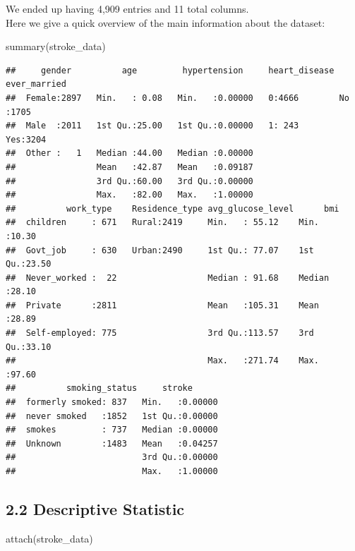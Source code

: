 \documentclass[
]{article}
\newenvironment{Shaded}{\begin{snugshade}}{\end{snugshade}}
\newcommand{\FunctionTok}[1]{\textcolor[rgb]{0.00,0.00,0.00}{#1}}
\newcommand{\NormalTok}[1]{#1}
\begin{document}
We ended up having 4,909 entries and 11 total columns.\\
Here we give a quick overview of the main information about the dataset:

\begin{Shaded}
\begin{Highlighting}[]
\FunctionTok{summary}\NormalTok{(stroke\_data)}
\end{Highlighting}
\end{Shaded}

\begin{verbatim}
##     gender          age         hypertension     heart_disease ever_married
##  Female:2897   Min.   : 0.08   Min.   :0.00000   0:4666        No :1705    
##  Male  :2011   1st Qu.:25.00   1st Qu.:0.00000   1: 243        Yes:3204    
##  Other :   1   Median :44.00   Median :0.00000                             
##                Mean   :42.87   Mean   :0.09187                             
##                3rd Qu.:60.00   3rd Qu.:0.00000                             
##                Max.   :82.00   Max.   :1.00000                             
##          work_type    Residence_type avg_glucose_level      bmi       
##  children     : 671   Rural:2419     Min.   : 55.12    Min.   :10.30  
##  Govt_job     : 630   Urban:2490     1st Qu.: 77.07    1st Qu.:23.50  
##  Never_worked :  22                  Median : 91.68    Median :28.10  
##  Private      :2811                  Mean   :105.31    Mean   :28.89  
##  Self-employed: 775                  3rd Qu.:113.57    3rd Qu.:33.10  
##                                      Max.   :271.74    Max.   :97.60  
##          smoking_status     stroke       
##  formerly smoked: 837   Min.   :0.00000  
##  never smoked   :1852   1st Qu.:0.00000  
##  smokes         : 737   Median :0.00000  
##  Unknown        :1483   Mean   :0.04257  
##                         3rd Qu.:0.00000  
##                         Max.   :1.00000
\end{verbatim}

\hypertarget{descriptive-statistic}{%
\subsection{2.2 Descriptive Statistic}\label{descriptive-statistic}}

\begin{Shaded}
\begin{Highlighting}[]
\FunctionTok{attach}\NormalTok{(stroke\_data)}
\end{Highlighting}
\end{Shaded}
\end{document}
